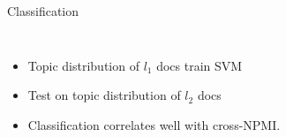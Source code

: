 \documentclass[compress]{beamer}
\begin{document}
		\begin{frame}{Classification}

                  \begin{columns}
			\begin{itemize}
				\item Topic distribution of $l_1$ docs
                                  train SVM
				\item Test on topic distribution of $l_2$ docs
				\item Classification correlates
                                  well with cross-NPMI.
			\end{itemize}
                    \end{columns}
		\end{frame}
	
\end{document}
